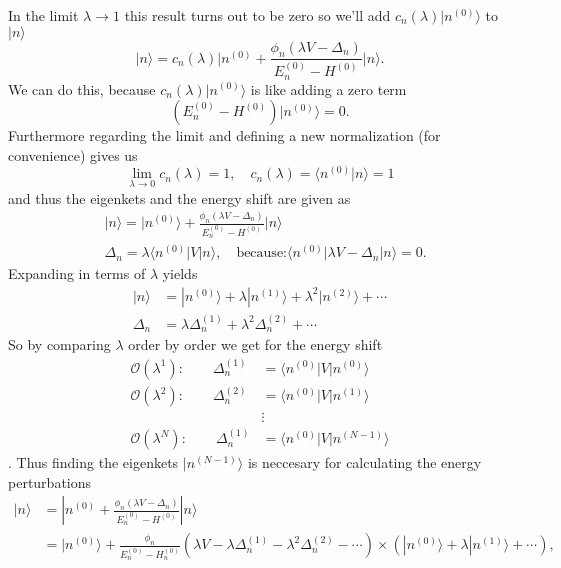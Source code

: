 In the limit $\lambda \to 1$ this result turns out to be zero so we'll add $c_n(\lambda) | n^{(0)} \rangle$ to $| n \rangle$
\begin{equation}
	| n \rangle = c_n(\lambda) | n^{(0)} + \frac{\phi_n (\lambda V - \Delta_n ) }{E_n^{(0)} - H^{(0)}} | n\rangle.
\end{equation}
We can do this, because $c_n(\lambda) | n^{(0)} \rangle$ is like adding a zero term
\begin{equation}
	(E_n^{(0)} - H^{(0)}) | n^{(0)} \rangle = 0.
\end{equation}
Furthermore regarding the limit and defining a new normalization (for convenience) gives us
\begin{equation}
	\lim_{\lambda \to 0} c_n(\lambda) = 1, \quad c_n(\lambda) = \langle n^{(0)} | n \rangle = 1
\end{equation}
and thus the eigenkets and the energy shift are given as
\begin{align}
	\label{schroedingerEigenket}
	&| n \rangle = |  n^{(0)}\rangle + \frac{\phi_n (\lambda V - \Delta_n ) }{E_n^{(0)} - H^{(0)}} | n\rangle \\
	&\Delta_n = \lambda \langle n^{(0)} | V | n \rangle, \quad \text{because:} \langle n^{(0)} | \lambda V - \Delta_n | n \rangle = 0.
\end{align}
Expanding in terms of $\lambda$ yields
\begin{align}
	|n\rangle &= |n^{(0)} \rangle + \lambda |n^{(1)} \rangle + \lambda^2 |n^{(2)} \rangle + \cdots \\
	\Delta_n &= \lambda \Delta_n^{(1)} + \lambda^2 \Delta_n^{(2)} + \cdots
\end{align}
So by comparing $\lambda$ order by order we get for the energy shift
\begin{align}
	\mathcal{O}(\lambda^1): \qquad \Delta_n^{(1)} &= \langle n^{(0)} | V | n^{(0)} \rangle \\
	\mathcal{O}(\lambda^2): \qquad \Delta_n^{(2)} &= \langle n^{(0)} | V | n^{(1)} \rangle \\
	& \vdots \\
	\mathcal{O}(\lambda^N): \qquad \Delta_n^{(1)} &= \langle n^{(0)} | V | n^{(N-1)} \rangle
\end{align}.
Thus finding the eigenkets $|n^{(N-1)}\rangle$ is neccesary for calculating the energy perturbations
\begin{align}
	| n \rangle &= |  n^{(0)} + \frac{\phi_n (\lambda V - \Delta_n ) }{E_n^{(0)} - H^{(0)}} | n\rangle \\
			&= |n^{(0)} \rangle + \frac{\phi_n}{E_n^{(0)} - H_n^{(0)}} ( \lambda V - \lambda \Delta_n^{(1)} - \lambda^2 \Delta_n^{(2)} - \cdots) \times ( |n^{(0)} \rangle + \lambda | n^{(1)} \rangle + \cdots ), 
\end{align}
